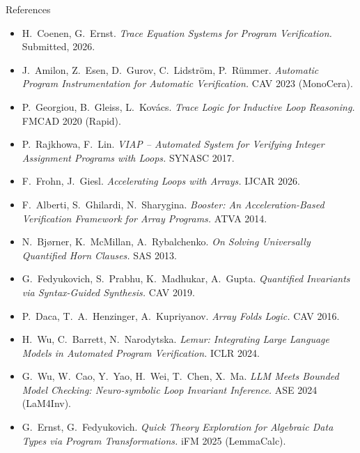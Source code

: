 \documentclass[aspectratio=1610,14pt]{beamer}
\begin{document}
\begin{frame}{References}
  \scriptsize
  \begin{itemize}
    \setlength{\itemsep}{0.15em}
    \item H.~Coenen, G.~Ernst. \emph{Trace Equation Systems for Program Verification.} Submitted, 2026.
    \item J.~Amilon, Z.~Esen, D.~Gurov, C.~Lidström, P.~Rümmer. \emph{Automatic Program Instrumentation for
      Automatic Verification.} CAV 2023 (MonoCera).
    \item P.~Georgiou, B.~Gleiss, L.~Kovács. \emph{Trace Logic for Inductive Loop Reasoning.} FMCAD 2020 (Rapid).
    \item P.~Rajkhowa, F.~Lin. \emph{VIAP -- Automated System for Verifying Integer Assignment Programs with Loops.}
      SYNASC 2017.
    \item F.~Frohn, J.~Giesl. \emph{Accelerating Loops with Arrays.} IJCAR 2026.
    \item F.~Alberti, S.~Ghilardi, N.~Sharygina. \emph{Booster: An Acceleration-Based Verification Framework for
      Array Programs.} ATVA 2014.
    \item N.~Bjørner, K.~McMillan, A.~Rybalchenko. \emph{On Solving Universally Quantified Horn Clauses.} SAS 2013.
    \item G.~Fedyukovich, S.~Prabhu, K.~Madhukar, A.~Gupta. \emph{Quantified Invariants via Syntax-Guided
      Synthesis.} CAV 2019.
    \item P.~Daca, T.~A.~Henzinger, A.~Kupriyanov. \emph{Array Folds Logic.} CAV 2016.
    \item H.~Wu, C.~Barrett, N.~Narodytska. \emph{Lemur: Integrating Large Language Models in Automated Program
      Verification.} ICLR 2024.
    \item G.~Wu, W.~Cao, Y.~Yao, H.~Wei, T.~Chen, X.~Ma. \emph{LLM Meets Bounded Model Checking: Neuro-symbolic
      Loop Invariant Inference.} ASE 2024 (LaM4Inv).
    \item G.~Ernst, G.~Fedyukovich. \emph{Quick Theory Exploration for Algebraic Data Types via Program
      Transformations.} iFM 2025 (LemmaCalc).
  \end{itemize}
\end{frame}
\end{document}
